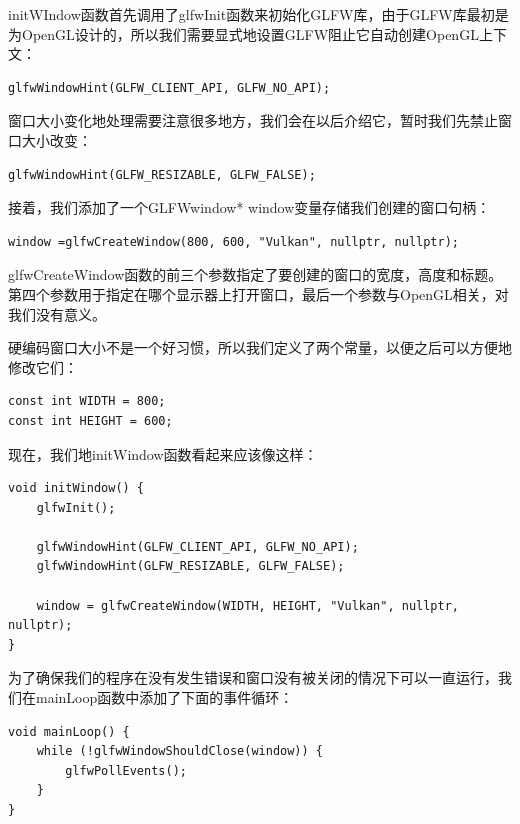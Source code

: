 \documentclass{ctexart}
\begin{document}
initWIndow函数首先调用了glfwInit函数来初始化GLFW库，由于GLFW库最初是为OpenGL设计的，所以我们需要显式地设置GLFW阻止它自动创建OpenGL上下文：

\begin{lstlisting}[language={[ANSI]C}]
glfwWindowHint(GLFW_CLIENT_API, GLFW_NO_API);
\end{lstlisting}

窗口大小变化地处理需要注意很多地方，我们会在以后介绍它，暂时我们先禁止窗口大小改变：

\begin{lstlisting}[language={[ANSI]C}]
glfwWindowHint(GLFW_RESIZABLE, GLFW_FALSE);
\end{lstlisting}

接着，我们添加了一个GLFWwindow* window变量存储我们创建的窗口句柄：

\begin{lstlisting}[language={[ANSI]C}]
window =glfwCreateWindow(800, 600, "Vulkan", nullptr, nullptr);
\end{lstlisting}

glfwCreateWindow函数的前三个参数指定了要创建的窗口的宽度，高度和标题。第四个参数用于指定在哪个显示器上打开窗口，最后一个参数与OpenGL相关，对我们没有意义。

硬编码窗口大小不是一个好习惯，所以我们定义了两个常量，以便之后可以方便地修改它们：

\begin{lstlisting}[language={[ANSI]C}]
const int WIDTH = 800;
const int HEIGHT = 600;
\end{lstlisting}

现在，我们地initWindow函数看起来应该像这样：

\begin{lstlisting}[language={[ANSI]C}]
void initWindow() {
	glfwInit();

	glfwWindowHint(GLFW_CLIENT_API, GLFW_NO_API);
	glfwWindowHint(GLFW_RESIZABLE, GLFW_FALSE);

	window = glfwCreateWindow(WIDTH, HEIGHT, "Vulkan", nullptr, nullptr);
}
\end{lstlisting}

为了确保我们的程序在没有发生错误和窗口没有被关闭的情况下可以一直运行，我们在mainLoop函数中添加了下面的事件循环：

\begin{lstlisting}[language={[ANSI]C}]
void mainLoop() {
	while (!glfwWindowShouldClose(window)) {
		glfwPollEvents();
	}
}
\end{lstlisting}
\end{document}

